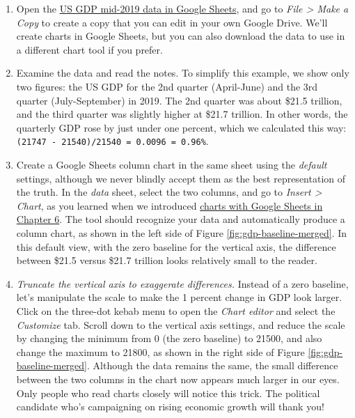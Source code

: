 \documentclass[
  english,
]{book}
\begin{document}
\begin{enumerate}
\def\labelenumi{\arabic{enumi}.}
\item
  Open the \href{https://docs.google.com/spreadsheets/d/1teB2Pw2lNpFjE_GCNmeqVNURSid36IMrWUROpPZMScA/edit\#gid=0}{US GDP mid-2019 data in Google Sheets}, and go to \emph{File \textgreater{} Make a Copy} to create a copy that you can edit in your own Google Drive. We'll create charts in Google Sheets, but you can also download the data to use in a different chart tool if you prefer.
\item
  Examine the data and read the notes. To simplify this example, we show only two figures: the US GDP for the 2nd quarter (April-June) and the 3rd quarter (July-September) in 2019. The 2nd quarter was about \$21.5 trillion, and the third quarter was slightly higher at \$21.7 trillion. In other words, the quarterly GDP rose by just under one percent, which we calculated this way: \texttt{(21747\ -\ 21540)/21540\ =\ 0.0096\ =\ 0.96\%}.
\item
  Create a Google Sheets column chart in the same sheet using the \emph{default} settings, although we never blindly accept them as the best representation of the truth. In the \emph{data} sheet, select the two columns, and go to \emph{Insert \textgreater{} Chart}, as you learned when we introduced \href{chart-google.html}{charts with Google Sheets in Chapter 6}. The tool should recognize your data and automatically produce a column chart, as shown in the left side of Figure \ref{fig:gdp-baseline-merged}. In this default view, with the zero baseline for the vertical axis, the difference between \$21.5 versus \$21.7 trillion looks relatively small to the reader.
\item
  \emph{Truncate the vertical axis to exaggerate differences.} Instead of a zero baseline, let's manipulate the scale to make the 1 percent change in GDP look larger. Click on the three-dot kebab menu to open the \emph{Chart editor} and select the \emph{Customize} tab. Scroll down to the vertical axis settings, and reduce the scale by changing the minimum from 0 (the zero baseline) to 21500, and also change the maximum to 21800, as shown in the right side of Figure \ref{fig:gdp-baseline-merged}. Although the data remains the same, the small difference between the two columns in the chart now appears much larger in our eyes. Only people who read charts closely will notice this trick. The political candidate who's campaigning on rising economic growth will thank you!
\end{enumerate}
\end{document}

